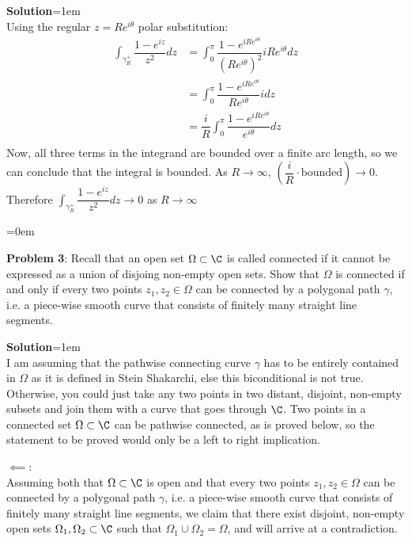 \documentclass{article}
\begin{document}
\textbf{Solution}\parskip=1em\\
Using the regular $z = Re^{i\theta}$ polar substitution:
\begin{align*}
    \int_{\gamma_R^+}\dfrac{1-e^{iz}}{z^2}dz &= \int_{0}^{\pi}\dfrac{1-e^{iRe^{i\theta}}}{(Re^{i\theta})^2}iRe^{i\theta}dz\\
    &= \int_{0}^{\pi}\dfrac{1-e^{iRe^{i\theta}}}{Re^{i\theta}}idz\\
    &= \dfrac{i}{R}\int_{0}^{\pi}\dfrac{1-e^{iRe^{i\theta}}}{e^{i\theta}}dz\\
\end{align*}
Now, all three terms in the integrand are bounded over a finite arc length, so we can conclude that the integral is bounded. As $R \to \infty$, $(\dfrac{i}{R} \cdot \text{bounded}) \to 0$. Therefore $\int_{\gamma_R^+}\dfrac{1-e^{iz}}{z^2}dz \to 0$ as $R \to \infty$

\newpage\parskip=0em
\begin{mdframed}[backgroundcolor=blue!20]
\textbf{Problem 3}: Recall that an open set $\Omega \subset \C$ is called connected if it cannot be expressed as a union of disjoing non-empty open sets. Show that $\Omega$ is connected if and only if every two points $z_1, z_2 \in \Omega$ can be connected by a polygonal path $\gamma$, i.e. a piece-wise smooth curve that consists of finitely many straight line segments.
\end{mdframed}
\textbf{Solution}\parskip=1em\\
I am assuming that the pathwise connecting curve $\gamma$ has to be entirely contained in $\Omega$ as it is defined in Stein Shakarchi, else this biconditional is not true. Otherwise, you could just take any two points in two distant, disjoint, non-empty subsets and join them with a curve that goes through $\C$. Two points in a connected set $\Omega \subset \C$ can be pathwise connected, as is proved below, so the statement to be proved would only be a left to right implication.

$\impliedby$:\\
Assuming both that $\Omega \subset \C$ is open and that every two points $z_1, z_2 \in \Omega$ can be connected by a polygonal path $\gamma$, i.e. a piece-wise smooth curve that consists of finitely many straight line segments, we claim that there exist disjoint, non-empty open sets $\Omega_1, \Omega_2 \subset \C$ such that $\Omega_1 \cup \Omega_2 = \Omega$, and will arrive at a contradiction.
\end{document}
